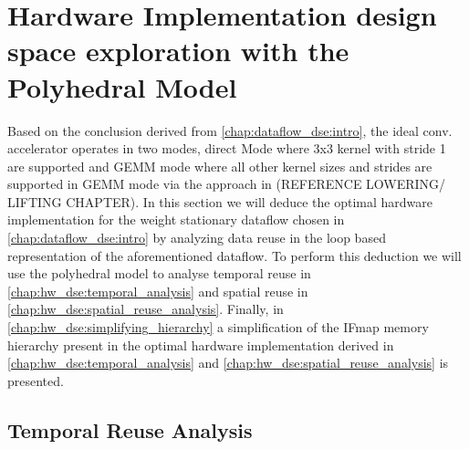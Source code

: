 

\section{Hardware Implementation design space exploration with the Polyhedral Model}
\label{chap:hw_dse:intro}

Based on the conclusion derived from \autoref{chap:dataflow_dse:intro},
the ideal conv. accelerator operates in two modes, direct Mode where 3x3 kernel
with stride 1 are supported and GEMM mode where all other kernel sizes and
strides are supported in GEMM mode via the approach in (REFERENCE LOWERING/
LIFTING CHAPTER). In this section we will deduce the optimal hardware
implementation for the weight stationary dataflow chosen in
\autoref{chap:dataflow_dse:intro} by analyzing data reuse in the loop based
representation of the aforementioned dataflow. To perform this deduction we will
use the polyhedral model to analyse temporal reuse in
\autoref{chap:hw_dse:temporal_analysis} and spatial reuse in
\autoref{chap:hw_dse:spatial_reuse_analysis}. Finally, in
\autoref{chap:hw_dse:simplifying_hierarchy} a simplification of the IFmap memory
hierarchy present in the optimal hardware implementation derived in
\autoref{chap:hw_dse:temporal_analysis} and
\autoref{chap:hw_dse:spatial_reuse_analysis} is presented.

\subsection{Temporal Reuse Analysis}
\label{chap:hw_dse:temporal_analysis}

